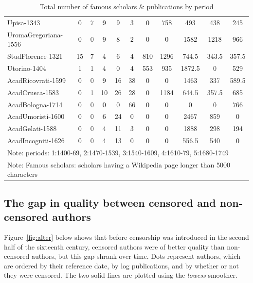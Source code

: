 \begin{table}[htbp]
\begin{tabular}{lcccccccccc}
Upisa-1343 & 0        & 7        & 9        & 9        & 3        & 0        & 758      & 493      & 438      & 245 \\
UromaGregoriana-1556 & 0        & 0        & 9        & 8        & 2        & 0        & 0        & 1582     & 1218     & 966 \\
StudFlorence-1321 & 15       & 7        & 4        & 6        & 4        & 810      & 1296     & 744.5    & 343.5    & 357.5 \\
Utorino-1404 & 1        & 1        & 4        & 0        & 4        & 553      & 935      & 1872.5   & 0        & 529 \\
AcadRicovrati-1599 & 0        & 0        & 9        & 16       & 38       & 0        & 0        & 1463     & 337      & 589.5 \\
AcadCrusca-1583 & 0        & 1        & 10       & 26       & 28       & 0        & 1184     & 644.5    & 357.5    & 685 \\
AcadBologna-1714 & 0        & 0        & 0        & 0        & 66       & 0        & 0        & 0        & 0        & 766 \\
AcadUmoristi-1600 & 0        & 0        & 6        & 24       & 0        & 0        & 0        & 2467     & 859      & 0 \\
AcadGelati-1588 & 0        & 0        & 4        & 11       & 3        & 0        & 0        & 1888     & 298      & 194 \\
AcadIncogniti-1626 & 0        & 0        & 4        & 13       & 0        & 0        & 0        & 556.5    & 540      & 0 \\
\bottomrule
			\multicolumn{11}{l}{\footnotesize Note: periods: 1:1400-69, 2:1470-1539, 3:1540-1609, 4:1610-79, 5:1680-1749}\\
			\multicolumn{11}{l}{\footnotesize Note: Famous scholars: scholars having a Wikipedia page longer than 5000 characters}
	\end{tabular}
	\caption{Total number of famous scholars \& publications by period}\label{table:europewiki}
\end{table}


\clearpage


\subsection{The gap in quality between censored and non-censored authors}\label{app:prf4}

Figure~\ref{fig:alter} below shows that before censorship was introduced in the second half of the sixteenth century, censored authors were of better quality than non-censored authors, but this gap shrank over time. Dots represent authors, which are ordered by their reference date, by log publications, and by whether or not they were censored. The two solid lines are plotted using the \textit{lowess} smoother.


